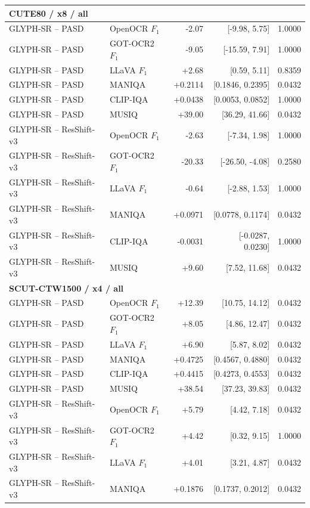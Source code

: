\begin{longtable}{llrrr}
\midrule
\multicolumn{5}{l}{\textbf{CUTE80 / x8 / all}}\\
\midrule
GLYPH-SR -- PASD & OpenOCR $F_1$ & -2.07 & [-9.98, 5.75] & 1.0000 \\
GLYPH-SR -- PASD & GOT-OCR2 $F_1$ & -9.05 & [-15.59, 7.91] & 1.0000 \\
GLYPH-SR -- PASD & LLaVA $F_1$ & +2.68 & [0.59, 5.11] & 0.8359 \\
GLYPH-SR -- PASD & MANIQA & +0.2114 & [0.1846, 0.2395] & 0.0432 \\
GLYPH-SR -- PASD & CLIP-IQA & +0.0438 & [0.0053, 0.0852] & 1.0000 \\
GLYPH-SR -- PASD & MUSIQ & +39.00 & [36.29, 41.66] & 0.0432 \\
GLYPH-SR -- ResShift-v3 & OpenOCR $F_1$ & -2.63 & [-7.34, 1.98] & 1.0000 \\
GLYPH-SR -- ResShift-v3 & GOT-OCR2 $F_1$ & -20.33 & [-26.50, -4.08] & 0.2580 \\
GLYPH-SR -- ResShift-v3 & LLaVA $F_1$ & -0.64 & [-2.88, 1.53] & 1.0000 \\
GLYPH-SR -- ResShift-v3 & MANIQA & +0.0971 & [0.0778, 0.1174] & 0.0432 \\
GLYPH-SR -- ResShift-v3 & CLIP-IQA & -0.0031 & [-0.0287, 0.0230] & 1.0000 \\
GLYPH-SR -- ResShift-v3 & MUSIQ & +9.60 & [7.52, 11.68] & 0.0432 \\
\midrule
\multicolumn{5}{l}{\textbf{SCUT-CTW1500 / x4 / all}}\\
\midrule
GLYPH-SR -- PASD & OpenOCR $F_1$ & +12.39 & [10.75, 14.12] & 0.0432 \\
GLYPH-SR -- PASD & GOT-OCR2 $F_1$ & +8.05 & [4.86, 12.47] & 0.0432 \\
GLYPH-SR -- PASD & LLaVA $F_1$ & +6.90 & [5.87, 8.02] & 0.0432 \\
GLYPH-SR -- PASD & MANIQA & +0.4725 & [0.4567, 0.4880] & 0.0432 \\
GLYPH-SR -- PASD & CLIP-IQA & +0.4415 & [0.4273, 0.4553] & 0.0432 \\
GLYPH-SR -- PASD & MUSIQ & +38.54 & [37.23, 39.83] & 0.0432 \\
GLYPH-SR -- ResShift-v3 & OpenOCR $F_1$ & +5.79 & [4.42, 7.18] & 0.0432 \\
GLYPH-SR -- ResShift-v3 & GOT-OCR2 $F_1$ & +4.42 & [0.32, 9.15] & 1.0000 \\
GLYPH-SR -- ResShift-v3 & LLaVA $F_1$ & +4.01 & [3.21, 4.87] & 0.0432 \\
GLYPH-SR -- ResShift-v3 & MANIQA & +0.1876 & [0.1737, 0.2012] & 0.0432 \\

\end{longtable}
